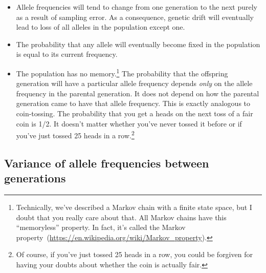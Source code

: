 \begin{itemize}

\item Allele frequencies will tend to change from one generation to
the next purely as a result of sampling error. As a consequence,
genetic drift will eventually lead to loss of all alleles in the
population except one.

\item The probability that any allele will eventually become fixed in
the population is equal to its current frequency.

\item The population has no memory.\footnote{Technically, we've
    described a Markov chain with a finite state space, but I doubt
    that you really care about that. All Markov chains have this
    ``memoryless'' property. In fact, it's called the Markov
    property~(\url{https://en.wikipedia.org/wiki/Markov_property}).} The probability that the 
  offspring generation will have a particular allele frequency depends
  {\it only\/} on the allele frequency in the parental generation. It
  does not depend on how the parental generation came to have that
  allele frequency. This is exactly analogous to coin-tossing. The
  probability that you get a heads on the next toss of a fair coin is
  1/2. It doesn't matter whether you've never tossed it before or if
  you've just tossed 25 heads in a row.\footnote{Of course, if you've
    just tossed 25 heads in a row, you could be forgiven for having
    your doubts about whether the coin is actually fair.}

\end{itemize}

\subsection*{Variance of allele frequencies between
  generations}

